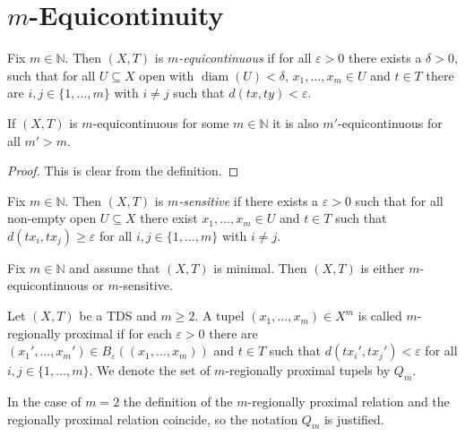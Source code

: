 \section{$m$-Equicontinuity}

\begin{definition}[$m$-Equicontinuity]
	Fix $m \in \mathbb{N}$. Then $(X, T)$ is \emph{$m$-equicontinuous} if for all $\varepsilon > 0$ there exists a $\delta > 0$, such that for all $U \subseteq X$ open with $\operatorname{diam}(U) < \delta$, $x_1, \dots, x_m \in U$ and $t \in T$ there are $i, j \in \{1, \dots, m\}$ with $i \neq j$ such that $d(tx, ty) < \varepsilon$.
\end{definition}

\begin{proposition}
	If $(X, T)$ is $m$-equicontinuous for some $m \in \mathbb{N}$ it is also $m'$-equicontinuous for all $m' > m$.
\end{proposition}
\begin{proof}
	This is clear from the definition.
\end{proof}

\begin{definition}[$m$-Sensitivity]
	Fix $m \in \mathbb{N}$. Then $(X, T)$ is \emph{$m$-sensitive} if there exists a $\varepsilon > 0$ such that for all non-empty open $U \subseteq X$ there exist $x_1, \dots, x_m \in U$ and $t \in T$ such that $d(tx_i, tx_j) \geq \varepsilon$ for all $i, j \in \{1, \dots, m\}$ with $i \neq j$.
\end{definition}

\begin{theorem}
	Fix $m \in \mathbb{N}$ and assume that $(X, T)$ is minimal. Then $(X, T)$ is either $m$-equicontinuous or $m$-sensitive.
\end{theorem}

\begin{definition}
	Let $(X, T)$ be a TDS and $m \geq 2$.
	A tupel $(x_1, \dots, x_m) \in X^m$ is called $m$-regionally proximal if for each $\varepsilon > 0$
	there are $(x_1', \dots, x_m') \in B_\varepsilon((x_1, \dots, x_m))$ and $t \in T$ such that $d(tx_i', tx_j') < \varepsilon$ for all $i, j \in \{1, \dots, m\}$.
	We denote the set of $m$-regionally proximal tupels by $Q_m$.
\end{definition}

\begin{remark}
	In the case of $m = 2$ the definition of the $m$-regionally proximal relation and the regionally proximal relation coincide,
	so the notation $Q_m$ is justified.
\end{remark}

